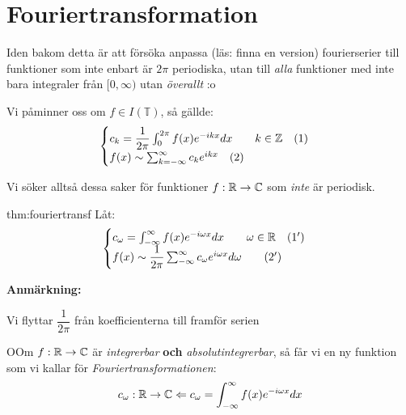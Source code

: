\section{Fouriertransformation}\par
\noindent Iden bakom detta är att försöka anpassa (läs: finna en version) fourierserier till funktioner som inte enbart är $2\pi$ periodiska, utan till \textit{alla} funktioner med inte bara integraler från $[0,\infty)$ utan \textit{överallt} :o
\par\bigskip
\noindent Vi påminner oss om $f\in I(\mathbb{T})$, så gällde:
\begin{equation*}
  \begin{gathered}
    \begin{cases}
      c_k = \dfrac{1}{2\pi}\int_{0}^{2\pi}f(x)e^{-ikx} dx\qquad k\in\mathbb{Z}\quad(1)\\
      f(x)\sim \sum_{k=-\infty}^{\infty}c_ke^{ikx}\quad(2)
    \end{cases}
  \end{gathered}
\end{equation*}
\par\bigskip
\noindent Vi söker alltså dessa saker för funktioner $f:\mathbb{R}\to\mathbb{C}$ som \textit{inte} är periodisk.
\par\bigskip
\begin{theo}[Fouriertransformation]{thm:fouriertransf}
  \noindent Låt:
  \begin{equation*}
    \begin{gathered}
      \begin{cases}
        c_\omega = \int_{-\infty}^{\infty}f(x)e^{-i\omega x}dx\qquad\omega\in\mathbb{R}\quad(1^{\prime})\\
        f(x)\sim \dfrac{1}{2\pi}\sum_{-\infty}^{\infty}c_\omega e^{i\omega x}d\omega\qquad(2^{\prime})
      \end{cases}
    \end{gathered}
  \end{equation*}
\end{theo}
\par\bigskip
\noindent\textbf{Anmärkning:}\par
\noindent Vi flyttar $\dfrac{1}{2\pi}$ från koefficienterna till framför serien 
\par\bigskip
\begin{theo}
  OOm $f:\mathbb{R}\to\mathbb{C}$ är \textit{integrerbar} \textbf{och} \textit{absolutintegrerbar}, så får vi en ny funktion som vi kallar för \textit{Fouriertransformationen}:
  \begin{equation*}
    \begin{gathered}
      c_\omega:\mathbb{R}\to\mathbb{C}\Leftarrow c_\omega = \int_{-\infty}^{\infty}f(x)e^{-i\omega x}dx
    \end{gathered}
  \end{equation*}
\end{theo}
